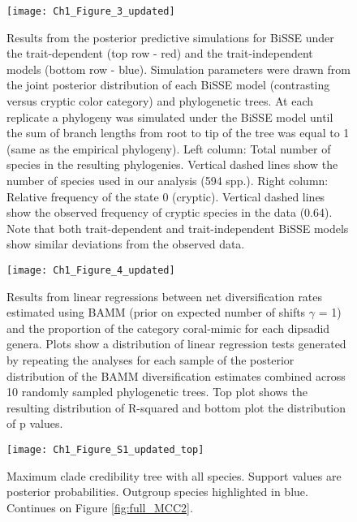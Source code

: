 \begin{figure}[h]
	\centering
	\texttt{[image: Ch1\_Figure\_3\_updated]}
	\caption[Results from the posterior predictive simulations for BiSSE under the trait-dependent and the trait-independent models.]{Results from the posterior predictive simulations for BiSSE under the trait-dependent (top row - red) and the trait-independent models (bottom row - blue). Simulation parameters were drawn from the joint posterior distribution of each BiSSE model (contrasting versus cryptic color category) and phylogenetic trees. At each replicate a phylogeny was simulated under the BiSSE model until the sum of branch lengths from root to tip of the tree was equal to 1 (same as the empirical phylogeny). Left column: Total number of species in the resulting phylogenies. Vertical dashed lines show the number of species used in our analysis (594 spp.). Right column: Relative frequency of the state 0 (cryptic). Vertical dashed lines show the observed frequency of cryptic species in the data (0.64). Note that both trait-dependent and trait-independent BiSSE models show similar deviations from the observed data.}
	\label{fig:predic_BiSSE} %
\end{figure}

\begin{figure}[h]
	\centering
	\texttt{[image: Ch1\_Figure\_4\_updated]}
	\caption[Results from linear regressions between net diversification rates estimated using BAMM and the proportion of the category coral-mimic for each dipsadid genera.]{Results from linear regressions between net diversification rates estimated using BAMM (prior on expected number of shifts $\gamma$ = 1) and the proportion of the category coral-mimic for each dipsadid genera. Plots show a distribution of linear regression tests generated by repeating the analyses for each sample of the posterior distribution of the BAMM diversification estimates combined across 10 randomly sampled phylogenetic trees. Top plot shows the resulting distribution of R-squared and bottom plot the distribution of p values.}
	\label{fig:linear_BAMM} %
\end{figure}

\begin{figure}[h]
	\centering
	\texttt{[image: Ch1\_Figure\_S1\_updated\_top]}
	\caption[Maximum clade credibility tree with all species (Part 1).]{Maximum clade credibility tree with all species. Support values are posterior probabilities. Outgroup species highlighted in blue. Continues on Figure \ref{fig:full_MCC2}.}
	\label{fig:full_MCC1} %
\end{figure}

